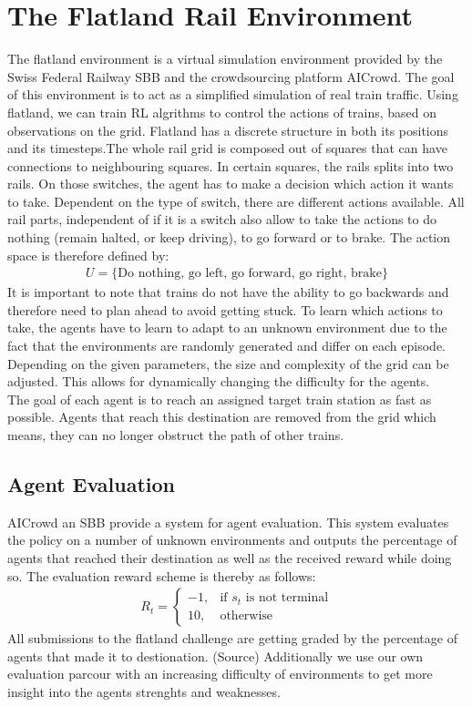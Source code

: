 \section{The Flatland Rail Environment}\label{projektmanagement}
The flatland environment is a virtual simulation environment provided by the Swiss Federal Railway SBB and the crowdsourcing platform AICrowd.
The goal of this environment is to act as a simplified simulation of real train traffic. Using flatland, we can train RL algrithms to control the actions of trains, based on observations on the grid. Flatland has a discrete structure in both its positions and its timesteps.The whole rail grid is composed out of squares that can have connections to neighbouring squares. In certain squares, the rails splits into two rails. On those switches, the agent has to make a decision which action it wants to take. Dependent on the type of switch, there are different actions available. All rail parts, independent of if it is a switch also allow to take the actions to do nothing (remain halted, or keep driving), to go forward or to brake. The action space is therefore defined by:
\begin{gather*}
U = \{ \text{Do nothing, go left, go forward, go right, brake} \}
\end{gather*}
It is important to note that trains do not have the ability to go backwards and therefore need to plan ahead to avoid getting stuck. To learn which actions to take, the agents have to learn to adapt to an unknown environment due to the fact that the environments are randomly generated and differ on each episode. Depending on the given parameters, the size and complexity of the grid can be adjusted. This allows for dynamically changing the difficulty for the agents.\\
The goal of each agent is to reach an assigned target train station as fast as possible. Agents that reach this destination are removed from the grid which means, they can no longer obstruct the path of other trains.
\subsection*{Agent Evaluation}\label{rl_agent_eval}
AICrowd an SBB provide a system for agent evaluation. This system evaluates the policy on a number of unknown environments and outputs the percentage of agents that reached their destination as well as the received reward while doing so. The evaluation reward scheme is thereby as follows:
\begin{gather*}
R_{t}= 
\begin{cases}
-1,				& \text{if } s_{t} \text{ is not terminal}\\
10,             & \text{otherwise}
\end{cases}
\end{gather*}
All submissions to the flatland challenge are getting graded by the percentage of agents that made it to destionation. (Source) Additionally we use our own evaluation parcour with an increasing difficulty of environments to get more insight into the agents strenghts and weaknesses.
